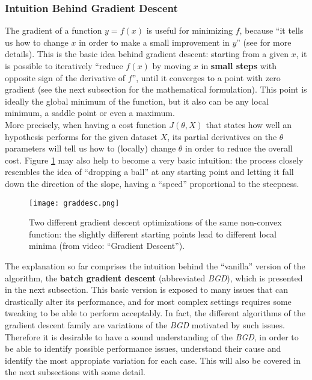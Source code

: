 \subsubsection{Intuition Behind Gradient Descent}
The gradient of a function \(y=f(x)\) is useful for minimizing \(f\), because ``it tells us how to change \(x\) in order to make a small improvement in \(y\)'' (see \cite[p. 83]{goodfellow} for more details). This is the basic idea behind gradient descent: starting from a given \(x\), it is possible to iteratively ``reduce \(f(x)\) by moving \(x\) in \textbf{small steps} with opposite sign of the derivative of \(f\)''\cite[p. 83]{goodfellow}, until it converges to a point with zero gradient (see the next subsection for the mathematical formulation). This point is ideally the global minimum of the function, but it also can be any local minimum, a saddle point or even a maximum.\\

More precisely, when having a cost function \(J(\theta, X)\) that states how well an hypothesis performs for the given dataset \(X\), its partial derivatives on the \(\theta\) parameters will tell us how to (locally) change \(\theta\) in order to reduce the overall cost. Figure \ref{fig:graddesc} may also help to become a very basic intuition: the process closely resembles the idea of ``dropping a ball'' at any starting point and letting it fall down the direction of the slope, having a ``speed'' proportional to the steepness.\\

\begin{figure}[h]
  \centering
  \texttt{[image: graddesc.png]}
  \caption{Two different gradient descent optimizations of the same non-convex function: the slightly different starting points lead to different local minima (from \cite{coursera-ml} video: ``Gradient Descent'').}
  \label{fig:graddesc}
\end{figure}

The explanation so far comprises the intuition behind the ``vanilla'' version of the algorithm, the \textbf{batch gradient descent} (abbreviated {\it BGD}), which is presented in the next subsection. This basic version is exposed to many issues that can drastically alter its performance, and for most complex settings requires some tweaking to be able to perform acceptably. In fact, the different algorithms of the gradient descent family are variations of the {\it BGD} motivated by such issues. Therefore it is desirable to have a sound understanding of the {\it BGD}, in order to be able to identify possible performance issues, understand their cause and identify the most appropiate variation for each case. This will also be covered in the next subsections with some detail.\\


